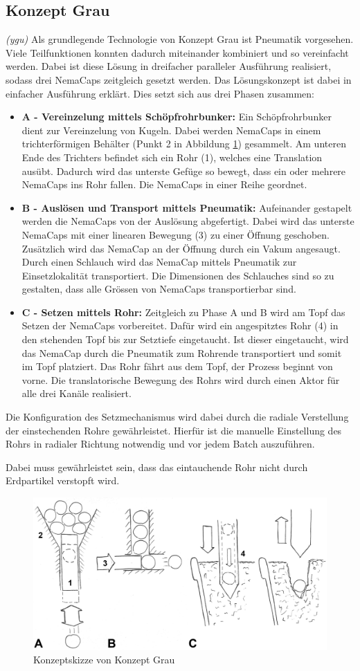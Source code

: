 \subsection{Konzept Grau}
\textit{(ygu)} Als grundlegende Technologie von Konzept Grau ist Pneumatik vorgesehen. Viele Teilfunktionen konnten dadurch miteinander kombiniert und so vereinfacht werden. Dabei ist diese Lösung in dreifacher paralleler Ausführung realisiert, sodass drei NemaCaps zeitgleich gesetzt werden. Das Lösungskonzept ist dabei in einfacher Ausführung erklärt. Dies setzt sich aus drei Phasen zusammen:
\begin{itemize}
	\item \textbf{A - Vereinzelung mittels Schöpfrohrbunker:}
	Ein Schöpfrohrbunker dient zur Vereinzelung von Kugeln. Dabei werden NemaCaps in einem trichterförmigen Behälter (Punkt 2 in Abbildung \ref{fig:konzept_grau}) gesammelt. Am unteren Ende des Trichters befindet sich ein Rohr (1), welches eine Translation ausübt. Dadurch wird das unterste Gefüge so bewegt, dass ein oder mehrere NemaCaps ins Rohr fallen. Die NemaCaps in einer Reihe geordnet.
	
	\item \textbf{B - Auslösen und Transport mittels Pneumatik:}
	Aufeinander gestapelt werden die NemaCaps von der Auslösung abgefertigt. Dabei wird das unterste NemaCaps mit einer linearen Bewegung (3) zu einer Öffnung geschoben. Zusätzlich wird das NemaCap an der Öffnung durch ein Vakum angesaugt. Durch einen Schlauch wird das NemaCap mittels Pneumatik zur Einsetzlokalität transportiert. Die Dimensionen des Schlauches sind so zu gestalten, dass alle Grössen von NemaCaps transportierbar sind.
	
	\item \textbf{C - Setzen mittels Rohr:}
	Zeitgleich zu Phase A und B wird am Topf das Setzen der NemaCaps vorbereitet. Dafür wird ein angespitztes Rohr (4) in den stehenden Topf bis zur Setztiefe eingetaucht. Ist dieser eingetaucht, wird das NemaCap durch die Pneumatik zum Rohrende transportiert und somit im Topf platziert. Das Rohr fährt aus dem Topf, der Prozess beginnt von vorne. Die translatorische Bewegung  des Rohrs wird durch einen Aktor für alle drei Kanäle realisiert.
\end{itemize}

Die Konfiguration des Setzmechanismus wird dabei durch die radiale Verstellung der einstechenden Rohre gewährleistet. Hierfür ist die manuelle Einstellung des Rohrs in radialer Richtung notwendig und vor jedem Batch auszuführen.

Dabei muss gewährleistet sein, dass das eintauchende Rohr nicht durch Erdpartikel verstopft wird.
\begin{figure}[H]
	\includegraphics[scale=0.52]{Illustrationen/5-Konzept/grau_Konzept.jpg}
	\caption{Konzeptskizze von Konzept Grau}
	\label{fig:konzept_grau}
\end{figure}
